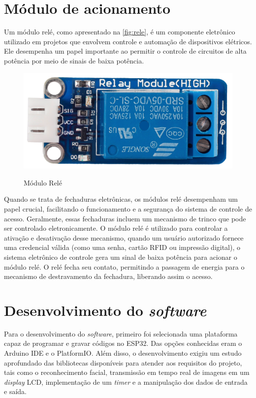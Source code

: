 \section{Módulo de acionamento}\label{sec:acionamento}

Um módulo relé, como apresentado na \autoref{fig:rele}, é um componente 
eletrônico utilizado em projetos que envolvem controle 
e automação de dispositivos elétricos. Ele desempenha 
um papel importante ao permitir o controle de circuitos 
de alta potência por meio de sinais de baixa potência.

\begin{figure}[h!]
    \centering
    \caption{Módulo Relé}
    \includegraphics[scale=0.8]{figuras/rele.png}
    \label{fig:rele}
    \centering
\end{figure}

Quando se trata de fechaduras eletrônicas, os módulos relé desempenham um 
papel crucial, facilitando o funcionamento e a segurança do sistema de 
controle de acesso. Geralmente, essas fechaduras 
incluem um mecanismo de trinco que pode ser controlado eletronicamente. 
O módulo relé é utilizado para controlar a ativação e desativação 
desse mecanismo, quando um usuário autorizado fornece uma credencial 
válida (como uma senha, cartão RFID ou impressão digital), o sistema 
eletrônico de controle gera um sinal de baixa potência para acionar 
o módulo relé. O relé fecha seu contato, permitindo a passagem de 
energia para o mecanismo de destravamento da fechadura, liberando 
assim o acesso.

\section{Desenvolvimento do \textit{software}}\label{sec:software}

Para o desenvolvimento do \textit{software}, primeiro foi selecionada uma
plataforma capaz de programar e gravar códigos no ESP32. 
Das opções conhecidas eram o Arduino IDE e o PlatformIO. 
Além disso, o desenvolvimento exigiu um estudo aprofundado das 
bibliotecas disponíveis para atender aos requisitos do projeto, 
tais como o reconhecimento facial, transmissão em tempo real de 
imagens em um \textit{display} LCD, implementação de um \textit{timer} e a manipulação 
dos dados de entrada e saída.

